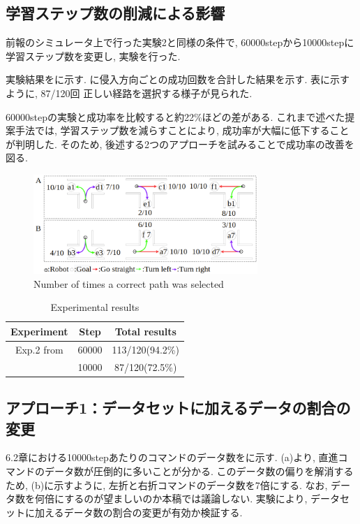 \documentclass{jarticle}
\begin{document}
\subsection{学習ステップ数の削減による影響}
前報\cite{mech}のシミュレータ上で行った実験2と同様の条件で, 60000stepから10000stepに学習ステップ数を変更し, 実験を行った.
\par 
実験結果をに示す. に侵入方向ごとの成功回数を合計した結果を示す.
表に示すように, 87/120回 正しい経路を選択する様子が見られた.
\par
60000stepの実験と成功率を比較すると約22\%ほどの差がある. これまで述べた提案手法では, 学習ステップ数を減らすことにより, 成功率が大幅に低下することが判明した. そのため, 後述する2つのアプローチを試みることで成功率の改善を図る.

\begin{figure}[h]
  \centering
   \includegraphics[width=85mm]{10000step.png}
   \vspace*{-4mm}
   \caption{Number of times a correct path was selected}
   \label{fig: fig9}
 \end{figure}

 \begin{table}[H]
  \caption{Experimental results}
  \label{tbl: table3}
  \centering
  \footnotesize
  \vspace{2mm}
  \begin{tabular}{|c|c|c|}
   \hline
   Experiment & Step & Total results \\\hline
   Exp.2 from \cite{mech} & 60000 & 113/120(94.2\%) \\ \cline{2-3}
  & 10000 & 87/120(72.5\%)\\
   \hline
  \end{tabular}
 \end{table}

\subsection{アプローチ1：データセットに加えるデータの割合の変更}
6.2章における10000stepあたりのコマンドのデータ数をに示す. (a)より, 直進コマンドのデータ数が圧倒的に多いことが分かる. このデータ数の偏りを解消するため, (b)に示すように, 左折と右折コマンドのデータ数を7倍にする. なお, データ数を何倍にするのが望ましいのか本稿では議論しない. 実験により, データセットに加えるデータ数の割合の変更が有効か検証する.
\end{document}
